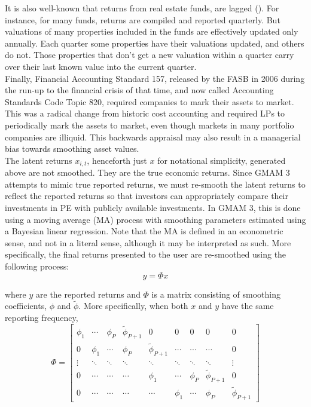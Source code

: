 \documentclass[11pt]{article}
\begin{document}
It is also well-known that returns from real estate funds, are lagged (\cite{geltner1993}). For instance, for many funds, returns are compiled and reported quarterly. But valuations of many properties included in the funds are effectively updated only annually. Each quarter some properties have their valuations updated, and others do not. Those properties that don't get a new valuation within a quarter carry over their last known value into the current quarter. \\

Finally, Financial Accounting Standard 157, released by the FASB in 2006 during the run-up to the financial crisis of that time, and now called Accounting Standards Code Topic 820, required companies to mark their assets to market. This was a radical change from historic cost accounting and required LPs to periodically mark the assets to market, even though markets in many portfolio companies are illiquid. This backwards appraisal may also result in a managerial bias towards smoothing asset values. \\

The latent returns $x_{i,t}$, henceforth just $x$ for notational simplicity, generated above are not smoothed. They are the true economic returns. Since GMAM 3 attempts to mimic true reported returns, we must re-smooth the latent returns to reflect the reported returns so that investors can appropriately compare their investments in PE with publicly available investments. In GMAM 3, this is done using a moving average (MA) process with smoothing parameters estimated using a Bayesian linear regression. Note that the MA is defined in an econometric sense, and not in a literal sense, although it may be interpreted as such. More specifically, the final returns presented to the user are re-smoothed using the following process:
\begin{equation}
\label{eq:y}
	y=\Phi x
\end{equation}

where $y$ are the reported returns and $\Phi$ is a matrix consisting of smoothing coefficients, $\phi$ and $\tilde{\phi}$. More specifically, when both $x$ and $y$ have the same reporting frequency,
\begin{equation}
\label{eq:phi}
	\Phi =
	\begin{bmatrix}
		\phi_{1} & \cdots & \phi_{P} & \tilde{\phi}_{P+1} & 0 & 0 & 0 & 0 & 0\\
		0 & \phi_{1} & \cdots & \phi_{P} & \tilde{\phi}_{P+1} & \cdots & \cdots & \cdots & 0\\
		\vdots & \ddots & \ddots & \ddots & \ddots & \ddots & \ddots & \ddots & \vdots\\
		0 & \cdots & \cdots & \cdots & \phi_{1} & \cdots & \phi_{P} & \tilde{\phi}_{P+1} & 0\\
		0 & \cdots & \cdots & \cdots & \cdots & \phi_{1} & \cdots & \phi_{P} & \tilde{\phi}_{P+1}
	\end{bmatrix} 
\end{equation}
\end{document}
